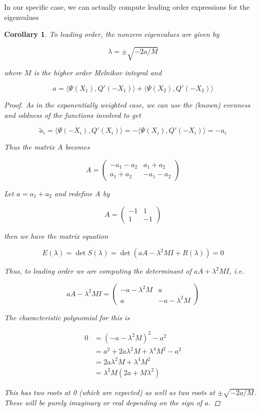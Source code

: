 \documentclass[12pt]{article}
\newtheorem{corollary}{Corollary}
\begin{document}
In our specific case, we can actually compute leading order expressions for the eigenvalues

\begin{corollary}
To leading order, the nonzero eigenvalues are given by

\begin{equation}
\lambda = \pm \sqrt{-2a/M}
\end{equation}

where $M$ is the higher order Melnikov integral and 

\begin{equation}
a = \langle \Psi (X_1), Q'(-X_1) \rangle 
+ \langle \Psi (X_2), Q'(-X_2) \rangle 
\end{equation}

\begin{proof}

As in the exponentially weighted case, we can use the (known) evenness and oddness of the functions involved to get

\[
\tilde{a}_i = \langle \Psi(-X_i), Q'(X_i) \rangle = -\langle \Psi(X_i), Q'(-X_i) \rangle = -a_i
\]

Thus the matrix $A$ becomes

\[
A = 
\begin{pmatrix}
-a_1 - a_2 & a_1 + a_2 \\
a_1 + a_2 & -a_1 - a_2 
\end{pmatrix}
\]

Let $a = a_1 + a_2$ and redefine $A$ by

\[
A = 
\begin{pmatrix}
-1 & 1 \\
1 & -1
\end{pmatrix}
\]

then we have the matrix equation

\[
E(\lambda) = \det S(\lambda) = \det(a A - \lambda^2 MI + R(\lambda) ) = 0
\]

Thus, to leading order we are computing the determinant of $a A + \lambda^2 MI$, i.e. 

\[
a A - \lambda^2 MI = 
\begin{pmatrix}
-a - \lambda^2 M & a \\
a & -a - \lambda^2 M
\end{pmatrix}
\]

The characteristic polynomial for this is

\begin{align*}
0 &= (-a - \lambda^2 M)^2 - a^2 \\
&= a^2 + 2 a \lambda^2 M + \lambda^4 M^2 - a^2 \\
&= 2 a \lambda^2 M + \lambda^4 M^2 \\
&= \lambda^2 M (2a + M \lambda^2 )
\end{align*}

This has two roots at 0 (which are expected) as well as two roots at $\pm \sqrt{-2a/M}$. These will be purely imaginary or real depending on the sign of $a$.

\end{proof}
\end{corollary}
\end{document}
